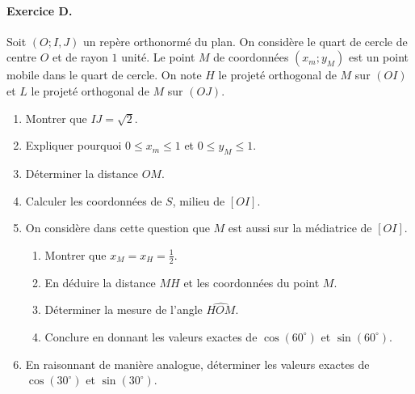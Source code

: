 \documentclass[11pt]{article}
\begin{document}
\paragraph{Exercice D.} Soit $(O; I, J)$ un repère orthonormé du plan. On
considère le quart de cercle de centre $O$ et de rayon $1$ unité. Le point $M$
de coordonnées $(x_m; y_M)$ est un point mobile dans le quart de cercle. On note
$H$ le projeté orthogonal de $M$ sur $(OI)$ et $L$ le projeté orthogonal de $M$
sur $(OJ)$.
\begin{minipage}[]{.6\textwidth}
\begin{enumerate}
  \item Montrer que $IJ=\sqrt 2$.
  \item Expliquer pourquoi $0\leq x_m\leq 1$ et $0\leq y_M\leq 1$.
  \item Déterminer la distance $OM$.
  \item Calculer les coordonnées de $S$, milieu de $\left[ OI \right]$.
  \item On considère dans cette question que $M$ est aussi sur la médiatrice de
    $\left[ OI \right]$.
    \begin{enumerate}
      \item Montrer que $x_M=x_H=\frac{1}{2}$.
      \item En déduire la distance $MH$ et les coordonnées du point $M$.
      \item Déterminer la mesure de l'angle $\widehat{HOM}$.
      \item Conclure en donnant les valeurs exactes de $\cos(60^\circ)$ et
        $\sin(60^\circ)$.
    \end{enumerate}
  \item En raisonnant de manière analogue, déterminer les valeurs exactes de
    $\cos(30^\circ)$ et $\sin(30^\circ)$.
\end{enumerate}
\end{minipage}
\begin{minipage}[]{.4\textwidth}
  \begin{center}
  \end{center}
\end{minipage}
\end{document}
